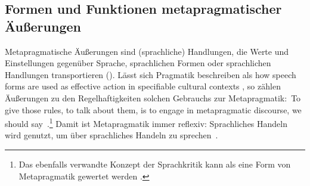 \subsection{Formen und Funktionen metapragmatischer Äußerungen}
\label{sec:MetapragmatischeAeusserungen}
Metapragmatische Äußerungen sind (sprachliche) Handlungen, die Werte und Einstellungen gegenüber Sprache, sprachlichen Formen oder sprachlichen Handlungen transportieren (\cites[s.][33]{Silverstein1993}[264]{Spitzmuller2013}[323--324]{Spitzmuller2014}). 
Lässt sich Pragmatik beschreiben als {\glqq}how speech forms are used as effective action in specifiable cultural contexts{\grqq} \citep[3]{Silverstein.1981}, so zählen {\"A}u{\ss}erungen zu den Regelhaftigkeiten solchen Gebrauchs zur Metapragmatik:~{\glqq}To give those rules, to talk about them, is to engage in {\glq}metapragmatic{\grq} discourse, we should say{\grqq}~\citep[3--4]{Silverstein.1981}.\footnote{Das ebenfalls verwandte Konzept der Sprachkritik kann als eine Form von Metapragmatik gewertet werden \citep[s.][3]{Schiewe.2005}.} 
Damit ist Metapragmatik immer reflexiv: Sprachliches Handeln wird genutzt, um über sprachliches Handeln zu sprechen~\citep[s.][116]{Gal.2016}. 

